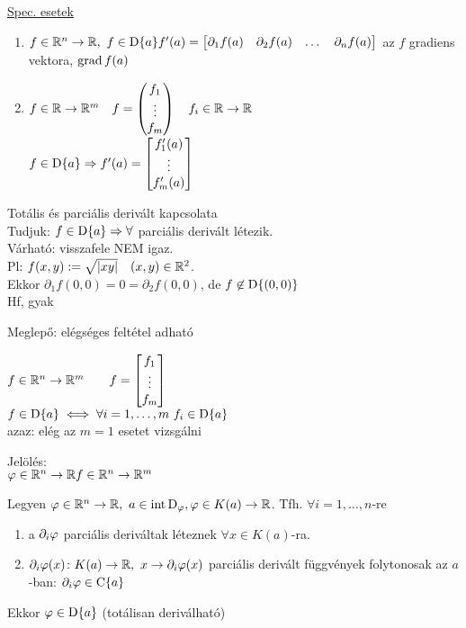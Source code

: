 \begin{Megj}
\item \underline{Spec. esetek}\\
\begin{enumerate}
  \item $f\in\mathbb{R}^n\to\mathbb{R},\ f\in\operatorname{D}\{a\}\\ f'(a) = \begin{bmatrix}\partial_1 f(a) & \partial_2 f(a) & \dots & \partial_n
    f(a)\end{bmatrix}$
    az $f$ gradiens vektora, $\operatorname{grad} f(a)$
  \item $f\in\mathbb{R}\to\mathbb{R}^m\quad f=\begin{pmatrix}f_1\\\vdots\\f_m\end{pmatrix}\quad f_i\in\mathbb{R}\to\mathbb{R}$\\
    $f\in\operatorname{D}\{a\}\Rightarrow f'(a) = \begin{bmatrix}f_1'(a)\\\vdots\\f_m'(a)\end{bmatrix}$
\end{enumerate}
\item Totális és parciális derivált kapcsolata\\
  Tudjuk: $f\in\operatorname{D}\{a\} \Rightarrow \forall $ parciális derivált létezik.\\
  Várható: visszafele NEM igaz.\\
  Pl: $f(x,y) := \sqrt{|xy|}\quad(x,y)\in\mathbb{R}^2$.\\
  Ekkor $\partial_1 f(0,0) = 0 = \partial_2 f(0,0)$, de $f\not\in\operatorname{D}\{(0,0)\}$\\
  Hf, gyak
\item Meglepő: elégséges feltétel adható
\item $f\in\mathbb{R}^n\to\mathbb{R}^m\qquad f=\begin{bmatrix}f_1\\\vdots\\f_m\end{bmatrix}$\\
  $f\in\der a \ekviv \forall i=1,\dotsc,m\ f_i\in\der a$\\
  azaz: elég az $m=1$ esetet vizsgálni  
\item Jelölés:\\
  $\varphi\in\mathbb{R}^n\to\mathbb{R}\\
  f\in\mathbb{R}^n\to\mathbb{R}^m$
\end{Megj}

\begin{te}
  Legyen $\varphi\in\RnR,\ a\in\intD_\varphi,\\\varphi\in K(a)\n\R$.
  Tfh. $\forall i=1,\dotsc,n$-re
  \begin{enumerate}
    \item a $\partial_i\varphi$ parciális deriváltak léteznek $\forall x\in K(a)$-ra.
    \item $\partial_i\vfi(x)\colon K(a)\n\R,\ x\n\partial_i \vfi(x)$ parciális derivált függvények
    folytonosak az $a$-ban: $\partial_i \varphi\in\operatorname{C}\{a\}$
  \end{enumerate}
Ekkor  $\varphi\in\operatorname{D}\{a\}$ (totálisan deriválható)
\end{te}

